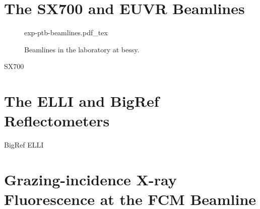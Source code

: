 \section{The SX700 and EUVR Beamlines}
\begin{figure}[htb]
    \def\svgwidth{\textwidth}
    {exp-ptb-beamlines.pdf_tex}
    \caption[\Gls{ptb} Beamlines in the \gls{bessy} laboratory.]{Beamlines in the laboratory at \gls{bessy}.}
    \label{ch_exp:fig_beamlines_bessy}
\end{figure}
SX700 \cite{beckhoff_quarter-century_2009}
\section{The ELLI and BigRef Reflectometers}
BigRef \cite{scholze_high-accuracy_2001}
ELLI \cite{soltwisch_polarization_2015}
\section{Grazing-incidence X-ray Fluorescence at the FCM Beamline}
